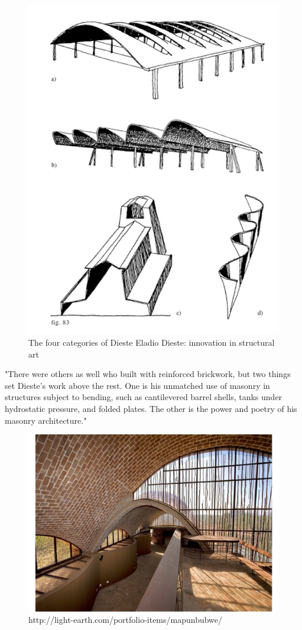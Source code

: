 \begin{figure}[H]
\centering
\includegraphics[width=0.4\linewidth ]{figure/Introduction/DiesteFour.JPG}
\caption{The four categories of Dieste Eladio Dieste: innovation in structural art}
\end{figure}

"There were others as well who built with reinforced brickwork, but two things set Dieste’s work above the rest. One is his unmatched use of masonry in structures subject to bending, such as cantilevered barrel shells, tanks under hydrostatic pressure, and folded plates. The other is the power and poetry of his masonry architecture."


\begin{figure}[H]
\centering
\includegraphics[width=0.9\linewidth ]{figure/Introduction/Vault_Contemporary.pdf}
\caption{http://light-earth.com/portfolio-items/mapunbubwe/}
\end{figure}


